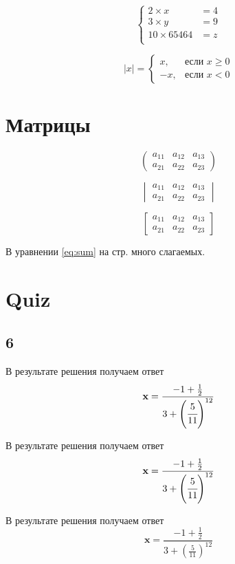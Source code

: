 \documentclass[a4paper,12pt]{article} %
\begin{document}
\[
	\left\{
		\begin{aligned}
			2\times x &= 4  \\
			3\times y &= 9\\
			10 \times 65464 &= z\\
		\end{aligned}
	\right.
\]

\[
	|x|=\begin{cases}
		x, &\text{если }  x \ge 0 \\
		-x, &\text{если } x<0
	\end{cases}
\]

\section{Матрицы}

\[
	\begin{pmatrix}
		a_{11} & a_{12} & a_{13} \\
		a_{21} & a_{22} & a_{23}
	\end{pmatrix}
\]

\[
	\begin{vmatrix}
		a_{11} & a_{12} & a_{13} \\
		a_{21} & a_{22} & a_{23}
	\end{vmatrix}
\]

\[
	\begin{bmatrix}
		a_{11} & a_{12} & a_{13} \\
		a_{21} & a_{22} & a_{23}
	\end{bmatrix}
\]

В уравнении \eqref{eq:sum} на стр. \pageref{eq:sum} много слагаемых.



\section{Quiz}

\subsection{6}

В результате решения получаем ответ
\[\mathbf x=\frac{-1+\frac12}
{3+\left(\cfrac{5}{11}\right)^{12}}\]

В результате решения получаем ответ
\[\mathbf{x}=\frac{-1+\frac{1}{2}}
{3+\left(\cfrac{5}{11}\right)^{12}}\]

В результате решения получаем ответ
\[\mathbf x=\frac{-1+\frac12}
{3+\left(\frac{5}{11}\right)^{12}}\]
\end{document}
